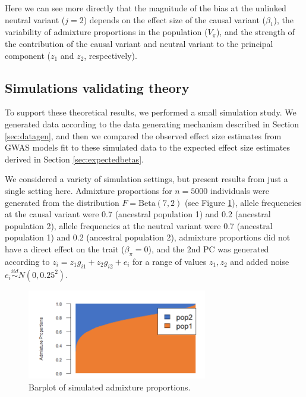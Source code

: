 \documentclass[12pt]{article}
\begin{document}
Here we can see more directly that the magnitude of the bias at the unlinked neutral variant ($j = 2$) depends on the effect size of the causal variant ($\beta_1$), the variability of admixture proportions in the population ($V_\pi$), and the strength of the contribution of the causal variant and neutral variant to the principal component ($z_1$ and $z_2$, respectively).

%


\subsection{Simulations validating theory}

To support these theoretical results, we performed a small simulation study. We generated data according to the data generating mechanism described in Section \ref{sec:datagen}, and then we compared the observed effect size estimates from GWAS models fit to these simulated data to the expected effect size estimates derived in Section \ref{sec:expectedbetas}. 

We considered a variety of simulation settings, but present results from just a single setting here. 
Admixture proportions for $n = 5000$ individuals were generated from the distribution $F = \text{Beta}(7,2)$ (see Figure \ref{fig:barplot}), 
allele frequencies at the causal variant were 0.7 (ancestral population 1) and 0.2 (ancestral population 2), 
allele frequencies at the neutral variant were 0.7 (ancestral population 1) and 0.2 (ancestral population 2), 
admixture proportions did not have a direct effect on the trait ($\beta_\pi = 0$), and 
the 2nd PC was generated according to $z_i = z_1 g_{i1} + z_2 g_{i2} + e_i$ for a range of values $z_1, z_2$ and added noise $e_i \overset{iid}{\sim} N(0, 0.25^2)$.  

\begin{figure}[!htb]
\centering
\includegraphics[width=0.7\textwidth]{figs/theorysims/sims_barplot}
\caption{Barplot of simulated admixture proportions.}
\label{fig:barplot}
\end{figure}
\end{document}
